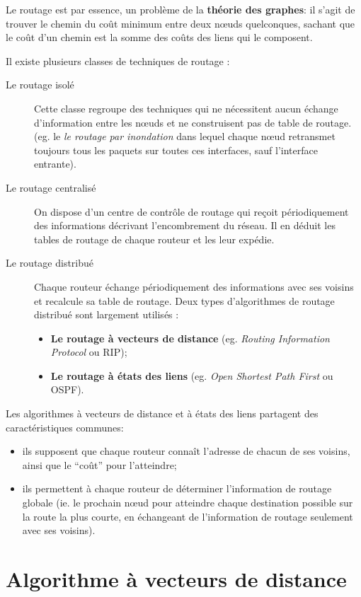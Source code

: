 \documentclass[11pt,english,french]{scrreprt}
\theoremstyle{remark}
\theoremstyle{definition}
\begin{document}
\vspace{10pt}
	
Le routage est par essence, un problème de la \textbf{théorie des graphes}: il s'agit de trouver le chemin du coût minimum entre deux nœuds quelconques, sachant que le coût d'un chemin est la somme des coûts des liens qui le composent.

Il existe plusieurs classes de techniques de routage :\begin{description}
	\item[Le routage isolé] Cette classe regroupe des techniques qui ne nécessitent aucun échange d'information entre les nœuds et ne construisent pas de table de routage. (eg. le \emph{le routage par inondation} dans lequel chaque nœud retransmet toujours tous les paquets sur toutes ces interfaces, sauf l'interface entrante).
	\item[Le routage centralisé] On dispose d'un centre de contrôle de routage qui reçoit périodiquement des informations décrivant l'encombrement du réseau. Il en déduit les tables de routage de chaque routeur et les leur expédie.
	\item[Le routage distribué] Chaque routeur échange périodiquement des informations avec ses voisins et recalcule sa table de routage. Deux types d'algorithmes de routage distribué sont largement utilisés :\begin{itemize}
		\item \textbf{Le routage à vecteurs de distance} (eg. \emph{Routing Information Protocol} ou RIP);
		\item \textbf{Le routage à états des liens} (eg. \emph{Open Shortest Path First} ou OSPF).
	\end{itemize}
\end{description}

Les algorithmes à vecteurs de distance et à états des liens partagent des caractéristiques communes:\begin{itemize}
	\item ils supposent que chaque routeur connaît l'adresse de chacun de ses voisins, ainsi que le ``coût'' pour l'atteindre;
	\item ils permettent à chaque routeur de déterminer l'information de routage globale (ie. le prochain nœud pour atteindre chaque destination possible sur la route la plus courte, en échangeant de l'information de routage seulement avec ses voisins).
\end{itemize}
	
\section{Algorithme à vecteurs de distance} %
\end{document}
